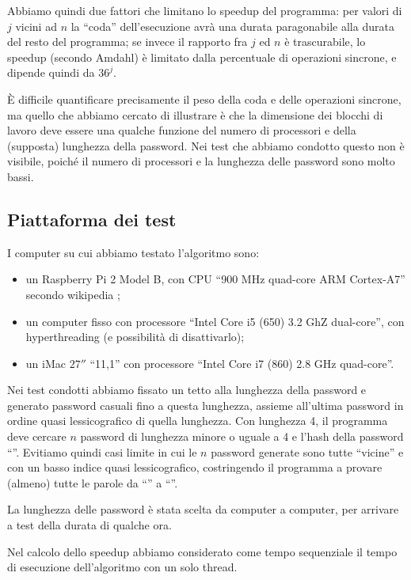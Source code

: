 \documentclass[]{myarticle}
\begin{document}
Abbiamo quindi due fattori che limitano lo speedup del programma: per valori di $j$ vicini ad $n$ la ``coda'' dell'esecuzione avr\`a una durata paragonabile alla durata del resto del programma; se invece il rapporto fra $j$ ed $n$ \`e trascurabile, lo speedup (secondo Amdahl) \`e limitato dalla percentuale di operazioni sincrone, e dipende quindi da $36^{j}$.

\`E difficile quantificare precisamente il peso della coda e delle operazioni sincrone, ma quello che abbiamo cercato di illustrare \`e che la dimensione dei blocchi di lavoro deve essere una qualche funzione del numero di processori e della (supposta) lunghezza della password.
Nei test che abbiamo condotto questo non \`e visibile, poich\'e il numero di processori e la lunghezza delle password sono molto bassi.

\subsection{Piattaforma dei test}

I computer su cui abbiamo testato l'algoritmo sono:
\begin{itemize}
	\item un Raspberry Pi 2 Model B, con CPU ``900 MHz quad-core ARM Cortex-A7'' secondo wikipedia \cite{wikipi};
	\item un computer fisso con processore ``Intel Core i5 (650) 3.2 GhZ dual-core'', con hyperthreading (e possibilit\`a di disattivarlo);
	\item un iMac $27''$ ``11,1'' con processore ``Intel Core i7 (860) 2.8 GHz quad-core''.
\end{itemize}

Nei test condotti abbiamo fissato un tetto alla lunghezza della password e generato password casuali fino a questa lunghezza, assieme all'ultima password in ordine quasi lessicografico di quella lunghezza.
Con lunghezza 4, il programma deve cercare $n$ password di lunghezza minore o uguale a 4 e l'hash della password ``''.
Evitiamo quindi casi limite in cui le $n$ password generate sono tutte ``vicine'' e con un basso indice quasi lessicografico, costringendo il programma a provare (almeno) tutte le parole da ``'' a ``''.

La lunghezza delle password \`e stata scelta da computer a computer, per arrivare a test della durata di qualche ora.

Nel calcolo dello speedup abbiamo considerato come tempo sequenziale il tempo di esecuzione dell'algoritmo con un solo thread.
\end{document}
